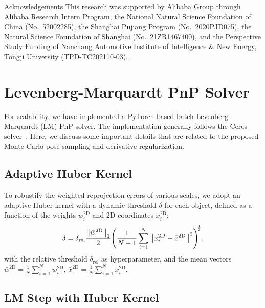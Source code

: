 \documentclass[10pt,twocolumn,letterpaper]{article}
\makeatletter
\let\originalleft\left
\let\originalright\right
\renewcommand{\left}{\mathopen{}\mathclose\bgroup\originalleft}
\renewcommand{\right}{\aftergroup\egroup\originalright}
\renewcommand{\paragraph}{
  \@startsection{paragraph}{4}
  {\z@}{1.0ex \@plus 0ex \@minus .3ex}{-1em}
  {\normalfont\normalsize\bfseries}
}
\makeatother
\begin{document}
\paragraph{Acknowledgements} This research was supported by Alibaba Group through Alibaba Research Intern Program, the National Natural Science Foundation of China (No.~52002285), the Shanghai Pujiang Program (No.~2020PJD075), the Natural Science Foundation of Shanghai (No.~21ZR1467400), and the Perspective Study Funding of Nanchang Automotive Institute of Intelligence \& New Energy, Tongji University (TPD-TC202110-03).

{\small


}

\clearpage
\setcounter{section}{0}
\renewcommand{\thesection}{\Alph{section}}

\section{Levenberg-Marquardt PnP Solver}

For scalability, we have implemented a PyTorch-based batch Levenberg-Marquardt (LM) PnP solver. The implementation generally follows the Ceres solver~\cite{ceres-solver}. Here, we discuss some important details that are related to the proposed Monte Carlo pose sampling and derivative regularization.

\subsection{Adaptive Huber Kernel}

To robustify the weighted reprojection errors of various scales, we adopt an adaptive Huber kernel with a dynamic threshold $\delta$ for each object, defined as a function of the weights ${w^\text{2D}_i}$ and 2D coordinates ${x^\text{2D}_i}$:
\begin{equation}
    \delta = \delta_\text{rel} \frac{\left\| \bar{w}^\text{2D} \right\|_1}{2}  \left( \frac{1}{N-1}\sum_{i=1}^N{\left\|x^\text{2D}_i - \bar{x}^\text{2D}\right\|^2} \right)^{\negthickspace\frac{1}{2}},
\end{equation}
with the relative threshold $\delta_\text{rel}$ as hyperparameter, and the mean vectors $\bar{w}^\text{2D}=\frac{1}{N}\sum_{i=1}^N{w_i^\text{2D}},\, \bar{x}^\text{2D}=\frac{1}{N}\sum_{i=1}^N{x_i^\text{2D}}$.

\subsection{LM Step with Huber Kernel}
\end{document}
